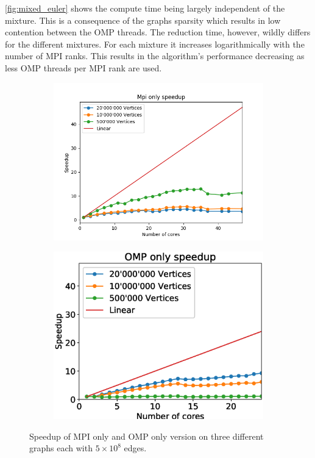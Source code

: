\autoref{fig:mixed_euler} shows the compute time being largely independent of the mixture. This is
a consequence of the graphs sparsity which results in low contention between the OMP threads. The
reduction time, however, wildly differs for the different mixtures. For each mixture it increases
logarithmically with the number of MPI ranks. This results in the algorithm's performance
decreasing as less OMP threads per MPI rank are used.


\begin{figure}
\begin{subfigure}[c]{0.23\textwidth}
\includegraphics[width=\textwidth]{plots/mpi_speedup_with_ref}
\label{fig:speedup_mpi}
\end{subfigure}
\begin{subfigure}[c]{0.23\textwidth}
\includegraphics[width=\textwidth]{plots/omp_speedup_with_ref}
\label{fig:speedup_omp}
\end{subfigure}
\caption{Speedup of MPI only and OMP only version on three different graphs each with
$5\times10^{8}$ edges.}
\label{fig:speedup}
\end{figure}

